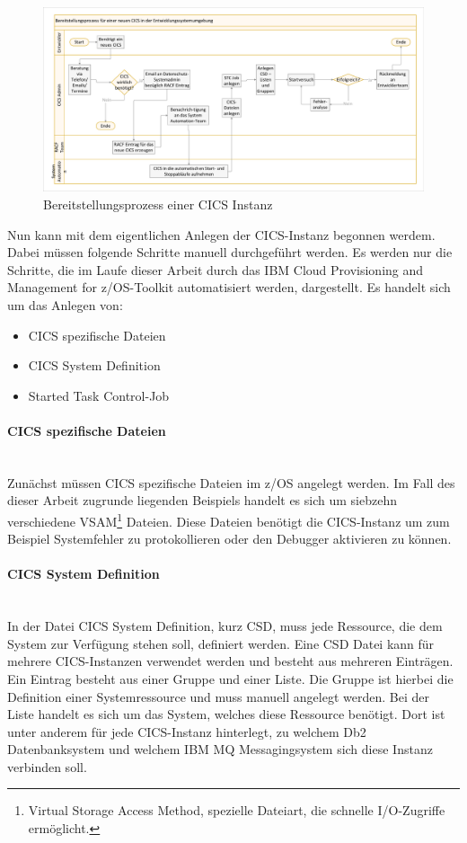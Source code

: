 \begin{figure}[ht!]
\centering
\includegraphics[width=\paperwidth,angle=90]{figures/swimlaneCICS.pdf}
\caption{Bereitstellungsprozess einer CICS Instanz}
\label{fig:aktcics}
\end{figure}

Nun kann mit dem eigentlichen Anlegen der CICS-Instanz begonnen werdem.
Dabei müssen folgende Schritte manuell durchgeführt werden.
Es werden nur die Schritte, die im Laufe dieser Arbeit durch das \glqq IBM Cloud Provisioning and Management for z/OS\grqq-Toolkit automatisiert werden, dargestellt.
Es handelt sich um das Anlegen von:

\begin{itemize}
\item CICS spezifische Dateien
\item \glqq CICS System Definition\grqq
\item Started Task Control-Job
\end{itemize}

\paragraph{CICS spezifische Dateien}\label{sssec:speziDat} ~\\
Zunächst müssen CICS spezifische Dateien im z/OS angelegt werden.
Im Fall des dieser Arbeit zugrunde liegenden Beispiels handelt es sich um siebzehn verschiedene VSAM\footnote{Virtual Storage Access Method, spezielle Dateiart, die schnelle I/O-Zugriffe ermöglicht.\cite{Lovelace.2013}} Dateien.
Diese Dateien benötigt die CICS-Instanz um zum Beispiel Systemfehler zu protokollieren oder den Debugger aktivieren zu können.

\paragraph{\glqq CICS System Definition\grqq} ~\\
In der Datei \glqq CICS System Definition\grqq, kurz CSD, muss jede Ressource, die dem System zur Verfügung stehen soll, definiert werden.
Eine CSD Datei kann für mehrere CICS-Instanzen verwendet werden und besteht aus mehreren Einträgen.
Ein Eintrag besteht aus einer Gruppe und einer Liste.
Die Gruppe ist hierbei die Definition einer Systemressource und muss manuell angelegt werden.
Bei der Liste handelt es sich um das System, welches diese Ressource benötigt.
Dort ist unter anderem für jede CICS-Instanz hinterlegt, zu welchem Db2 Datenbanksystem und welchem IBM MQ Messagingsystem sich diese Instanz verbinden soll.

